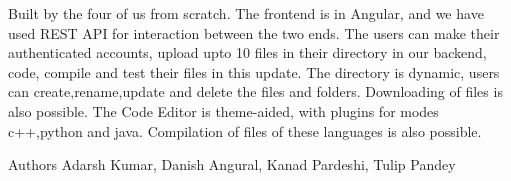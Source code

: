Built by the four of us from scratch. The frontend is in Angular, and we have used REST API for interaction between the two ends. The users can make their authenticated accounts, upload upto 10 files in their directory in our backend, code, compile and test their files in this update. The directory is dynamic, users can create,rename,update and delete the files and folders. Downloading of files is also possible. The Code Editor is theme-\/aided, with plugins for modes c++,python and java. Compilation of files of these languages is also possible. \begin{DoxyAuthor}{Authors}
Adarsh Kumar, Danish Angural, Kanad Pardeshi, Tulip Pandey 
\end{DoxyAuthor}
